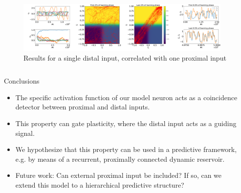 \documentclass{beamer}
\begin{document}
\begin{frame}[t]
\begin{columns}[t]
\begin{column}{.5\textwidth}
\end{column}
\end{columns}
\vspace{\baselineskip}
\begin{figure}
\begin{flushleft}
\includegraphics[width=0.95\textwidth]{../figures/fig2.pdf}
\end{flushleft}
\caption{Results for a single distal input, correlated with one proximal input}
\label{fig:Results_1}
\end{figure}

\begin{columns}[t]
\begin{column}{.4\textwidth}
\vspace{-1.83\baselineskip}
\begin{myblock}{Conclusions}
\begin{itemize}
\item The specific activation function of our model neuron acts as a coincidence detector between proximal and distal inputs.
\item This property can gate plasticity, where the distal input acts as a guiding signal.
\item We hypothesize that this property can be used in a predictive framework, e.g. by means of a recurrent, proximally connected dynamic reservoir.
\item Future work: Can external proximal input be included? If so, can we extend this model to a hierarchical predictive structure?
\end{itemize}
\end{myblock}
\end{column}
\begin{column}{.5\textwidth}
\noindent\rule{\textwidth}{2px}
\begin{footnotesize}


\end{footnotesize}
\end{column}
\end{columns}

\end{frame}
\end{document}
